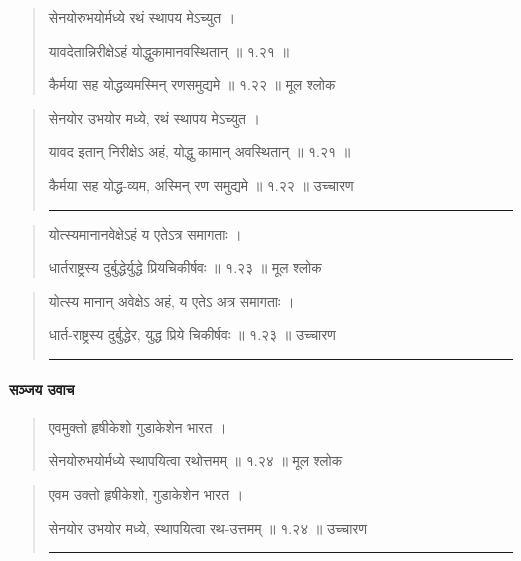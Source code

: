 \begin{quotation} 



सेनयोरुभयोर्मध्ये रथं स्थापय मेऽच्युत  ।  

यावदेतान्निरीक्षेऽहं योद्धुकामानवस्थितान्‌  ॥ १.२१ ॥ 

कैर्मया सह योद्धव्यमस्मिन् रणसमुद्यमे  ॥ १.२२ ॥  मूल श्लोक
\end{quotation}

\begin{quotation}

सेनयोर उभयोर मध्ये, रथं स्थापय मेऽच्युत  ।  

यावद इतान् निरीक्षेऽ अहं, योद्धु कामान् अवस्थितान्  ॥ १.२१ ॥ 

कैर्मया सह योद्ध-व्यम, अस्मिन् रण समुद्यमे  ॥ १.२२ ॥  उच्चारण

\noindent\rule{16cm}{0.4pt} 
\end{quotation}


\begin{quotation} 

योत्स्यमानानवेक्षेऽहं य एतेऽत्र समागताः  ।  

धार्तराष्ट्रस्य दुर्बुद्धेर्युद्धे प्रियचिकीर्षवः  ॥ १.२३ ॥  मूल श्लोक
\end{quotation}

\begin{quotation}

योत्स्य मानान् अवेक्षेऽ अहं, य एतेऽ अत्र समागताः  ।  

धार्त-राष्ट्रस्य दुर्बुद्धेर, युद्ध प्रिये चिकीर्षवः  ॥ १.२३ ॥  उच्चारण

\noindent\rule{16cm}{0.4pt} 
\end{quotation}


\paragraph{\sanskrit सञ्जय उवाच}
\begin{quotation} 


एवमुक्तो हृषीकेशो गुडाकेशेन भारत  ।  

सेनयोरुभयोर्मध्ये स्थापयित्वा रथोत्तमम्‌  ॥ १.२४ ॥  मूल श्लोक
\end{quotation}

\begin{quotation}

एवम उक्तो हृषीकेशो, गुडाकेशेन भारत  ।  

सेनयोर उभयोर मध्ये, स्थापयित्वा रथ-उत्तमम्  ॥ १.२४ ॥  उच्चारण

\noindent\rule{16cm}{0.4pt} 
\end{quotation}


